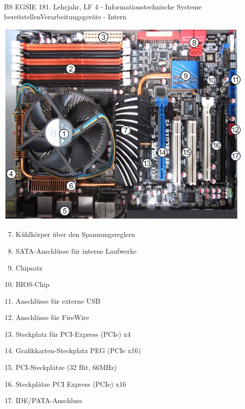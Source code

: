 \documentclass[oneside,openany,headings=optiontotoc,11pt,numbers=noenddot]{article}
\begin{document}
\begin{worksheet}{BS EGSIE 18}{1. Lehrjahr, LF 4 - Informationstechnische Systeme bereitstellen}{Verarbeitungsgeräte - Intern}
\begin{minipage}{0.35\textwidth}
\begin{enumerate}
			\end{enumerate}
		\end{minipage}
		\hfill
		\begin{minipage}{0.6\textwidth}
			\includegraphics[width=0.95\textwidth]{../99_Bilder/MB.jpg}
		\end{minipage}
		\vfill
		\begin{enumerate}
			\setcounter{enumi}{6}
			\item Kühlkörper über den Spannungsreglern
			\item SATA-Anschlüsse für interne Laufwerke
			\item Chipsatz
			\item BIOS-Chip
			\item Anschlüsse für externe USB
			\item Anschlüsse für FireWire
			\item Steckplatz für PCI-Express (PCIe) x4
			\item Grafikkarten-Steckplatz PEG (PCIe x16)
			\item PCI-Steckplätze (32 Bit, 66MHz)
			\item Steckplätze PCI Express (PCIe) x16
			\item IDE/PATA-Anschluss
		\end{enumerate}

\end{worksheet}
\end{document}
